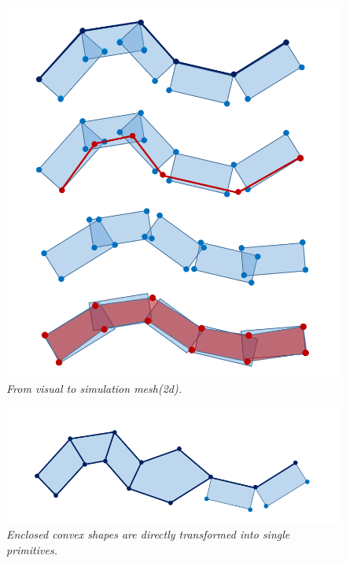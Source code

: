 \documentclass[
	11pt, 
	DIV10,
	a4paper, 
	oneside, 
	headings=normal, 
	captions=tableheading,
	final, 
	numbers=noenddot
]{scrartcl}
\begin{document}
	\begin{minipage}{0.5\textwidth}
		\begin{figure}[H]
			\centering
			\includegraphics[scale = 0.27]{PhysicalMeshCreation_1.PNG}
			\caption[caption]{\label{PhysicalMeshCreation_1} \textit{From visual to simulation mesh(2d).}\footnotemark[1]}
		\end{figure}
	\end{minipage}
	\begin{minipage}{0.5\textwidth}
		\begin{figure}[H]
			\centering
			\includegraphics[scale = 0.3]{PhysicalMeshCreation_2.PNG}
			\caption[caption]{\label{PhysicalMeshCreation_2} \textit{Enclosed convex shapes are directly transformed into single primitives.}\footnotemark[1]}
		\end{figure}
	\end{minipage}
\end{document}
